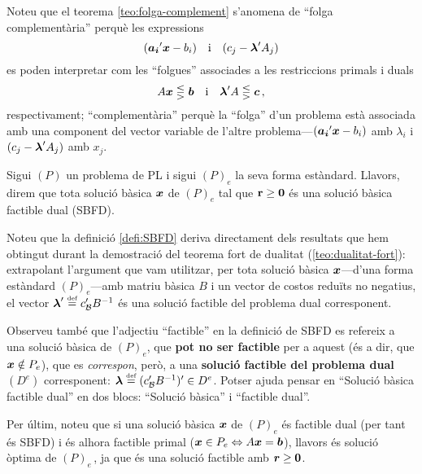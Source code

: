 Noteu que el teorema \ref{teo:folga-complement} s'anomena de ``folga complementària'' perquè les expressions \[(\boldsymbol{a_i}'\boldsymbol{x}-b_i) \quad \text{i}\quad (c_j-\boldsymbol{\lambda}'A_j) \] es poden interpretar com les ``folgues'' associades a les restriccions primals i duals \[A\boldsymbol{x} \lesseqgtr \boldsymbol{b} \quad \text{i}\quad \boldsymbol{\lambda}'A \lesseqgtr \boldsymbol{c}\,,\] respectivament; ``complementària'' perquè la ``folga'' d'un problema està associada amb una component del vector variable de l'altre problema---$(\boldsymbol{a_i}'\boldsymbol{x}-b_i)$ amb $\lambda_i$ i $(c_j-\boldsymbol{\lambda}'A_j)$ amb $x_j$.

\begin{defi}\label{defi:SBFD}
    Sigui $\left(P\right)$ un problema de PL i sigui $(P)_e$ la seva forma estàndard. Llavors, direm que tota solució bàsica $\boldsymbol{x}$ de $\left(P\right)_e$ tal que $\mathbf{r} \geq \boldsymbol{0}$ és una solució bàsica factible dual (SBFD).
\end{defi}

Noteu que la definició \ref{defi:SBFD} deriva directament dels resultats que hem obtingut durant la demostració del teorema fort de dualitat (\ref{teo:dualitat-fort}): extrapolant l'argument que vam utilitzar, per tota solució bàsica $\boldsymbol{x}$---d'una forma estàndard $(P)_e$---amb matriu bàsica $B$ i un vector de costos reduïts no negatius, el vector $\boldsymbol{\lambda}' \stackrel{\text{\tiny def}}{=} c_{\mathcal{B}}' B^{-1}$ és una solució factible del problema dual corresponent.

Observeu també que l'adjectiu ``factible'' en la definició de SBFD es refereix a una solució bàsica de $(P)_e$, que \textbf{pot no ser factible} per a aquest (és a dir, que $\boldsymbol{x}\notin P_e$), que es \textit{correspon}, però, a una \textbf{solució factible del problema dual} $(D^e)$ corresponent: $\boldsymbol{\lambda} \stackrel{\text{\tiny def}}{=} (c_{\mathcal{B}}' B^{-1})' \in D^e$. Potser ajuda pensar en ``Solució bàsica factible dual'' en dos blocs: ``Solució bàsica'' i ``factible dual''.

Per últim, noteu que si una solució bàsica $\boldsymbol{x}$ de $(P)_e$ és factible dual (per tant és SBFD) i és alhora factible primal ($\boldsymbol{x} \in P_e \Leftrightarrow A\boldsymbol{x} = \boldsymbol{b}$), llavors és solució òptima de $(P)_e\,$, ja que és una solució factible amb $\boldsymbol{r}\ge \boldsymbol{0}$.


